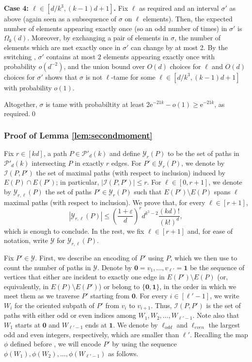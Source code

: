 \documentclass[reqno,final,a4paper]{amsart}
\theoremstyle{definition}
\newcommand{\cI}{\mathcal{I}}
\newcommand{\cP}{\mathcal{P}}
\newcommand{\cY}{\mathcal{Y}}
\def\e{\mathrm{e}}
\def\eps{\varepsilon}
\newcommand{\1}{\mathbbm{1}}
\begin{document}
\vspace{0.5em}
\noindent \textbf{Case 4: $\ell \in [d/k^3,(k-1)d+1]$.} 
Fix $\ell$ as required and an interval $\sigma'$ as above (again seen as a subsequence of $\sigma$ on $\ell$ elements).
Then, the expected number of elements appearing exactly once (so an odd number of times) in $\sigma'$ is $\Omega_k(d)$.
Moreover, by exchanging a pair of elements in $\sigma$, the number of elements which are met exactly once in $\sigma'$ can change by at most 2.
By the switching , $\sigma'$ contains at most $2$ elements appearing exactly once with probability $o(d^{-2})$, and the union bound over $O(d)$ choices for $\ell$ and $O(d)$ choices for $\sigma'$ shows that $\sigma$ is not $\ell$-tame for some $\ell\in [d/k^3,(k-1)d+1]$ with probability $o(1)$.

\vspace{0.5em}
\noindent 
Altogether, $\sigma$ is tame with probabiltity at least $2\e^{-21k}-o(1)\ge \e^{-21k}$, as required.\qed

\subsubsection{Proof of Lemma \ref{lem:secondmoment}}\label{subsec:secondmoment}
Fix $r\in [kd]$, a path $P \in \cP'_d(k)$ and define $\cY_r(P)$ to be the set of paths in $\cP'_d(k)$ intersecting $P$ in exactly $r$ edges. 
For $P'\in \cY_r(P)$, we denote by $\mathcal{I}(P,P')$ the set of maximal paths (with respect to inclusion) induced by $E(P)\cap E(P')$; 
in particular, $|\mathcal{I}(P,P')|\leq r$. 
For $\ell \in [0,r+1]$, we denote by $\cY_{r,\ell}(P)$ the set of paths $P'\in \cY_r(P)$ such that $E(P')\setminus E(P)$ spans $\ell$ maximal paths (with respect to inclusion). We prove that, for every $\ell\in [r+1]$,
\begin{equation}\label{main:eq}
    |\cY_{r,\ell}(P)|\leq \left(\frac{1+\eps}{d}\right)^r d^{k^5-2} \frac{(kd)!}{(k!)^d},
\end{equation}
which is enough to conclude.
In the rest, we fix $\ell\in [r+1]$ and, for ease of notation, write $\cY$ for $\cY_{r,\ell}(P)$.

Fix $P'\in \cY$. First, we describe an encoding of $P'$ using $P$, which we then use to count the number of paths in $\cY$. 
Denote by $\textbf{0}=v_1,...,v_{\ell'}=\textbf{1}$ be the sequence of vertices that either are incident to exactly one edge in $E(P')\setminus E(P)$ (or, equivalently, in $E(P)\setminus E(P')$) or belong to $\{\textbf{0},\textbf{1}\}$, in the order in which we meet them as we traverse $P'$ starting from $\textbf{0}$. 
For every $i\in [\ell'-1]$, we write $W_i$ for the oriented subpath of $P'$ from $v_i$ to $v_{i+1}$. 
Thus, $\cI(P,P')$ is the set of paths with either odd or even indices among $W_1,W_2,...,W_{\ell'-1}$. Note also that $W_1$ starts at $\textbf{0}$ and $W_{\ell'-1}$ ends at $\textbf{1}$.
We denote by $\ell_{odd}$ and $\ell_{even}$ the largest odd and even integers, respectively, which are smaller than $\ell'$. 
Recalling the map $\phi$ defined before , we will encode $P'$ by using the sequence $\phi(W_1),\phi(W_2),...,\phi(W_{\ell'-1})$ as follows. 
\end{document}
